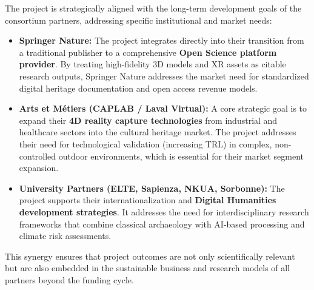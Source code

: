 The project is strategically aligned with the long-term development goals of the consortium partners, addressing specific institutional and market needs:

\begin{itemize}
  \item \textbf{Springer Nature:} 
  The project integrates directly into their transition from a traditional publisher to a comprehensive \textbf{Open Science platform provider}. By treating high-fidelity 3D models and XR assets as citable research outputs, Springer Nature addresses the market need for standardized digital heritage documentation and open access revenue models.
  \item \textbf{Arts et Métiers (CAPLAB / Laval Virtual):}
  A core strategic goal is to expand their \textbf{4D reality capture technologies} from industrial and healthcare sectors into the cultural heritage market. The project addresses their need for technological validation (increasing TRL) in complex, non-controlled outdoor environments, which is essential for their market segment expansion.
  \item \textbf{University Partners (ELTE, Sapienza, NKUA, Sorbonne):}
  The project supports their internationalization and \textbf{Digital Humanities development strategies}. It addresses the need for interdisciplinary research frameworks that combine classical archaeology with AI-based processing and climate risk assessments.
\end{itemize}

This synergy ensures that project outcomes are not only scientifically relevant but are also embedded in the sustainable business and research models of all partners beyond the funding cycle.